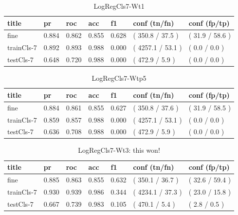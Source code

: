 \documentclass[ms]{nuthesis}
\begin{document}
\FloatBarrier
\begin{table}[H]
\centering
\begin{tabular}{|l||l||l||l||l||l||l|}\toprule
title & pr & roc & acc & f1 & conf (tn/fn) & conf (fp/tp) \\ \midrule
fine & 0.884 & 0.862 & 0.855 & 0.628 & ( 350.8 / 37.5 ) & ( 31.9 / 58.6 ) \\
trainCls-7 & 0.892 & 0.893 & 0.988 & 0.000 & ( 4257.1 / 53.1 ) & ( 0.0 / 0.0 ) \\
testCls-7 & 0.648 & 0.720 & 0.988 & 0.000 & ( 472.9 / 5.9 ) & ( 0.0 / 0.0 ) \\ \bottomrule
\end{tabular}
\caption{LogRegCls7-Wt1}
\label{tab:LogRegCls7-Wt1}
\end{table}
\FloatBarrier

\FloatBarrier
\begin{table}[H]
\centering
\begin{tabular}{|l||l||l||l||l||l||l|}\toprule
title & pr & roc & acc & f1 & conf (tn/fn) & conf (fp/tp) \\ \midrule
fine & 0.884 & 0.861 & 0.855 & 0.627 & ( 350.8 / 37.6 ) & ( 31.9 / 58.5 ) \\
trainCls-7 & 0.859 & 0.857 & 0.988 & 0.000 & ( 4257.1 / 53.1 ) & ( 0.0 / 0.0 ) \\
testCls-7 & 0.636 & 0.708 & 0.988 & 0.000 & ( 472.9 / 5.9 ) & ( 0.0 / 0.0 ) \\ \bottomrule
\end{tabular}
\caption{LogRegCls7-Wtp5}
\label{tab:LogRegCls7-Wtp5}
\end{table}
\FloatBarrier



\FloatBarrier
\begin{table}[H]
\centering
\begin{tabular}{|l||l||l||l||l||l||l|}\toprule
title & pr & roc & acc & f1 & conf (tn/fn) & conf (fp/tp) \\ \midrule
fine & 0.885 & 0.863 & 0.855 & 0.632 & ( 350.1 / 36.7 ) & ( 32.6 / 59.4 ) \\
trainCls-7 & 0.930 & 0.939 & 0.986 & 0.344 & ( 4234.1 / 37.3 ) & ( 23.0 / 15.8 ) \\
testCls-7 & 0.667 & 0.739 & 0.983 & 0.105 & ( 470.1 / 5.4 ) & ( 2.8 / 0.5 ) \\ \bottomrule
\end{tabular}
\caption{LogRegCls7-Wt3: this won!}
\label{tab:LogRegCls7-Wt3}
\end{table}
\FloatBarrier
\end{document}
